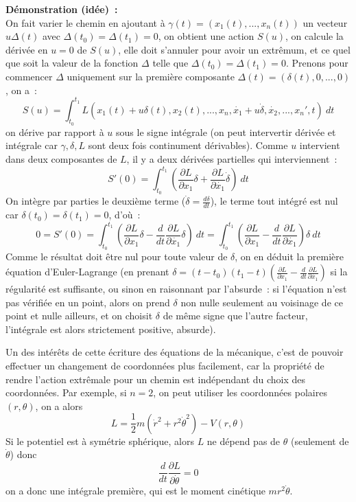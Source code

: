 \documentclass[a4paper,11pt]{article}
\begin{document}
\begin{giacjshere}
{\bf D\'emonstration (id\'ee)~:}\\
On fait varier le chemin en ajoutant \`a 
$\gamma(t)=(x_1(t),...,x_n(t))$
un vecteur $u \Delta(t)$ avec $\Delta(t_0)=\Delta(t_1)=0$, on obtient
une action $S(u)$, on calcule la d\'eriv\'ee en $u=0$
de $S(u)$, elle doit s'annuler pour avoir un extr\^emum, et
ce quel que soit la valeur de la fonction $\Delta$ 
telle que $\Delta(t_0)=\Delta(t_1)=0$. Prenons pour commencer $\Delta$
uniquement sur la premi\`ere composante
$\Delta(t)=(\delta(t),0,...,0)$, on a~:
$$ S(u) = \int_{t_0}^{t_1}
L(x_1(t)+u\delta(t),x_2(t),...,x_n,\dot{x_1}+u\dot{\delta},\dot{x_2},...,x_n',t)  \ dt$$
on d\'erive par rapport \`a $u$ sous le signe int\'egrale (on peut
intervertir d\'eriv\'ee et int\'egrale car $\gamma, \delta, L$ sont
deux fois continument d\'erivables). Comme $u$ intervient dans deux
composantes de $L$, il y a deux d\'eriv\'ees partielles qui
interviennent~:
$$ S'(0) =\int_{t_0}^{t_1} \left(\frac{\partial L}{\partial x_1} \delta + 
\frac{\partial L}{\partial \dot{x_1}} \dot{\delta} \right) \ dt$$
On int\`egre par parties le deuxi\`eme terme ($\dot{\delta}=\frac{d
  \delta}{dt}$), le terme tout int\'egr\'e est nul 
car $\delta(t_0)=\delta(t_1)=0$, d'o\`u~:
$$ 0=S'(0)=\int_{t_0}^{t_1} \left( \frac{\partial L}{\partial x_1} \delta 
-\frac{d}{dt} \frac{\partial L}{\partial \dot{x_1}} \delta \right) \
dt
=\int_{t_0}^{t_1} \left( \frac{\partial L}{\partial x_1} 
-\frac{d}{dt} \frac{\partial L}{\partial \dot{x_1}} \right) \delta \
dt$$
Comme le r\'esultat doit \^etre nul
pour toute valeur de $\delta$, on en d\'eduit la premi\`ere
\'equation d'Euler-Lagrange (en prenant
$\delta=(t-t_0)(t_1-t) (\frac{\partial L}{\partial x_1} 
-\frac{d}{dt} \frac{\partial L}{\partial \dot{x_1}})$ si la r\'egularit\'e
est suffisante, ou sinon en raisonnant par l'absurde~:
si l'\'equation n'est pas v\'erifi\'ee
en un point, alors on prend $\delta$ non nulle seulement
au voisinage de ce point et nulle ailleurs, et on choisit $\delta$
de m\^eme signe que l'autre facteur, l'int\'egrale est alors
strictement positive, absurde).

Un des int\'er\^ets de cette \'ecriture des \'equations de la
m\'ecanique, c'est de pouvoir effectuer un changement de coordonn\'ees
plus facilement, car la propri\'et\'e de rendre l'action extr\^emale pour un
chemin est ind\'ependant du choix des coordonn\'ees.
Par exemple, si $n=2$, on peut utiliser les coordonn\'ees polaires 
$(r,\theta)$, on a alors
$$ L=\frac12m(\dot{r}^2+r^2 \dot{\theta}^2) - V(r,\theta)$$
Si le potentiel est \`a sym\'etrie sph\'erique, alors $L$ ne
d\'epend pas de $\theta$ (seulement de $\dot{\theta}$) donc
$$ \frac{d}{dt} \frac{\partial L}{\partial \dot{\theta}} = 0$$
on a donc une int\'egrale premi\`ere, qui est le moment cin\'etique
$mr^2 \dot{\theta}$.


\end{giacjshere}
\end{document}

